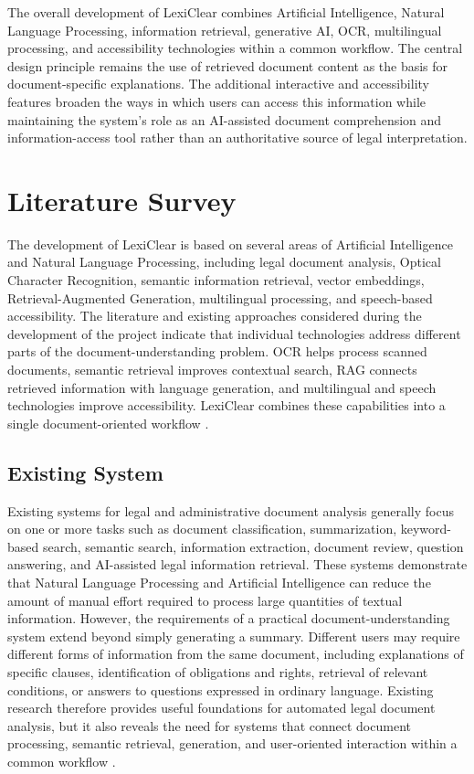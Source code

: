 \documentclass[12pt,a4paper,oneside]{report}
\begin{document}
The overall development of LexiClear combines Artificial Intelligence,
Natural Language Processing, information retrieval, generative AI, OCR,
multilingual processing, and accessibility technologies within a common
workflow. The central design principle remains the use of retrieved document
content as the basis for document-specific explanations. The additional
interactive and accessibility features broaden the ways in which users can
access this information while maintaining the system's role as an
AI-assisted document comprehension and information-access tool rather than an
authoritative source of legal interpretation.

\chapter{Literature Survey}

The development of LexiClear is based on several areas of Artificial Intelligence
and Natural Language Processing, including legal document analysis, Optical
Character Recognition, semantic information retrieval, vector embeddings,
Retrieval-Augmented Generation, multilingual processing, and speech-based
accessibility. The literature and existing approaches considered during the
development of the project indicate that individual technologies address
different parts of the document-understanding problem. OCR helps process
scanned documents, semantic retrieval improves contextual search, RAG connects
retrieved information with language generation, and multilingual and speech
technologies improve accessibility. LexiClear combines these capabilities into a single
document-oriented workflow \cite{mahoney2019,kandula2023,jurisai2025}.

\section{Existing System}

Existing systems for legal and administrative document analysis generally focus
on one or more tasks such as document classification, summarization,
keyword-based search, semantic search, information extraction, document review,
question answering, and AI-assisted legal information retrieval. These systems
demonstrate that Natural Language Processing and Artificial Intelligence can
reduce the amount of manual effort required to process large quantities of
textual information. However, the requirements of a practical
document-understanding system extend beyond simply generating a summary.
Different users may require different forms of information from the same
document, including explanations of specific clauses, identification of
obligations and rights, retrieval of relevant conditions, or answers to
questions expressed in ordinary language. Existing research therefore provides
useful foundations for automated legal document analysis, but it also reveals
the need for systems that connect document processing, semantic retrieval,
generation, and user-oriented interaction within a common workflow
\cite{mahoney2019,kandula2023,pramanik2025}.
\end{document}
